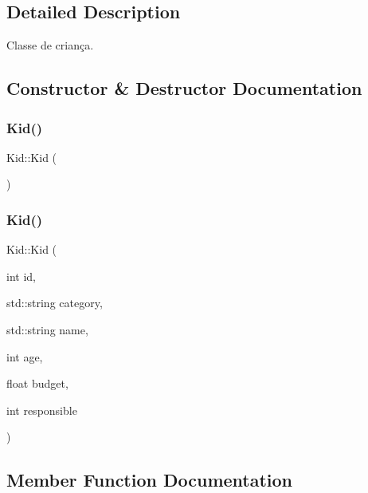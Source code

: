 \subsection{Detailed Description}
Classe de criança. 

\subsection{Constructor \& Destructor Documentation}
\mbox{\label{class_kid_a853cac010b91c16bf7a21c8f2ea7fbfa}} 
\subsubsection{\texorpdfstring{Kid()}{Kid()}\hspace{0.1cm}{\footnotesize\ttfamily [1/2]}}
{\footnotesize\ttfamily Kid\+::\+Kid (\begin{DoxyParamCaption}{ }\end{DoxyParamCaption})}

\mbox{\label{class_kid_a881c2e60104c76968f7b58fc4c485ed6}} 
\subsubsection{\texorpdfstring{Kid()}{Kid()}\hspace{0.1cm}{\footnotesize\ttfamily [2/2]}}
{\footnotesize\ttfamily Kid\+::\+Kid (\begin{DoxyParamCaption}\item[{int}]{id,  }\item[{std\+::string}]{category,  }\item[{std\+::string}]{name,  }\item[{int}]{age,  }\item[{float}]{budget,  }\item[{int}]{responsible }\end{DoxyParamCaption})}



\subsection{Member Function Documentation}
\mbox{\label{class_kid_a9bdb175dea42c7ce02baf00ec9cbd1c5}} 
